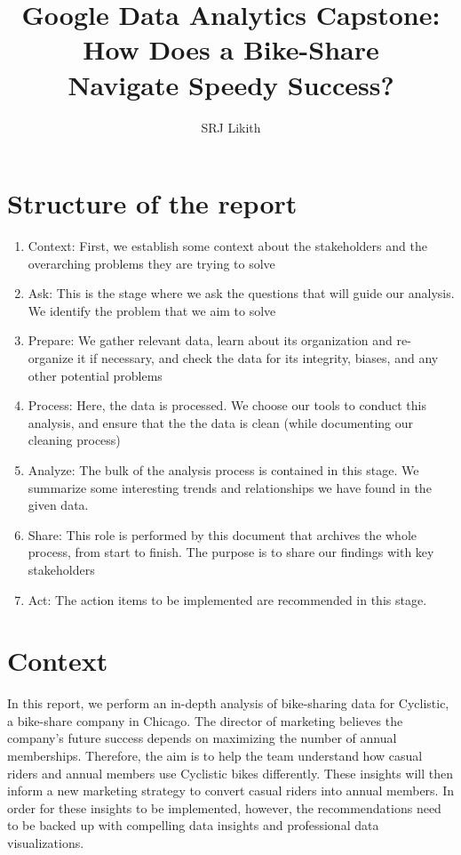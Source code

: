 \documentclass{article}
\title{Google Data Analytics Capstone:\\How Does a Bike-Share\\Navigate Speedy Success?}
\author{SRJ Likith}
\date{}
\begin{document}
\maketitle

\section{Structure of the report}

\begin{enumerate}
\item Context: First, we establish some context about the stakeholders and the overarching problems they are trying to solve
\item Ask: This is the stage where we ask the questions that will guide our analysis. We identify the problem that we aim to solve
\item Prepare: We gather relevant data, learn about its organization and re-organize it if necessary, and check the data for its integrity, biases, and any other potential problems
\item Process: Here, the data is processed. We choose our tools to conduct this analysis, and ensure that the the data is clean (while documenting our cleaning process)
\item Analyze: The bulk of the analysis process is contained in this stage. We summarize some interesting trends and relationships we have found in the given data.
\item Share: This role is performed by this document that archives the whole process, from start to finish. The purpose is to share our findings with key stakeholders
  \item Act: The action items to be implemented are recommended in this stage.
\end{enumerate}


\section{Context}
In this report, we perform an in-depth analysis of bike-sharing data for Cyclistic, a bike-share company in Chicago. The director of marketing believes the company's future success depends on maximizing the number of annual memberships. Therefore, the aim is to help the team understand how casual riders and annual members use Cyclistic bikes differently. These insights will then inform a new marketing strategy to convert casual riders into annual members. In order for these insights to be implemented, however, the recommendations need to be backed up with compelling data insights and professional data visualizations.
\end{document}
